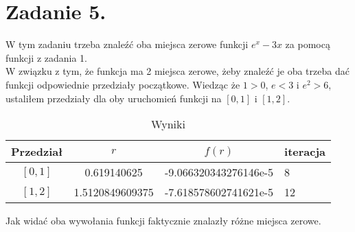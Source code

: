 \documentclass{article}
\begin{document}
\section{Zadanie 5.}
W tym zadaniu trzeba znaleźć oba miejsca zerowe funkcji $e^x-3x$ za pomocą funkcji z zadania 1.\\
W związku z tym, że funkcja ma 2 miejsca zerowe, żeby znaleźć je oba trzeba dać funkcji odpowiednie przedziały początkowe. Wiedząc że $1>0$, $e<3$ i $e^2>6$, ustaliłem przedziały dla oby uruchomień funkcji na $[0,1]$ i $[1,2]$.
\begin{table}[h!]
  \begin{center}
    \caption{Wyniki}
    \label{tab:table1}
    \begin{tabular}{c|c|c|l}
      \textbf{Przedział} & \textbf{$r$} & \textbf{$f(r)$} & \textbf{iteracja}\\
      \hline
      \textbf{$[0,1]$} & 0.619140625 & -9.066320343276146e-5 & 8\\
      \textbf{$[1,2]$} &  1.5120849609375 & -7.618578602741621e-5 & 12\\
    \end{tabular}
  \end{center}
\end{table}
Jak widać oba wywołania funkcji faktycznie znalazły różne miejsca zerowe.
\end{document}
